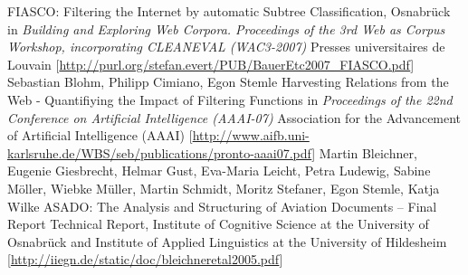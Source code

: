 \documentclass[11pt,a4paper]{moderncv}
\begin{document}
        {FIASCO: Filtering the Internet by automatic Subtree Classification,
        Osnabr{\"u}ck}
        {\small in {\em Building and Exploring Web Corpora. Proceedings of the
        3rd Web as Corpus Workshop, incorporating CLEANEVAL (WAC3-2007)}}
        {\small Presses universitaires de Louvain}
        {[\url{http://purl.org/stefan.evert/PUB/BauerEtc2007_FIASCO.pdf}]}
        {Sebastian Blohm, Philipp Cimiano, Egon Stemle}
        {Harvesting Relations from the Web - Quantifiying the Impact of
        Filtering Functions}
        {\small in {\em Proceedings of the 22nd Conference on Artificial
        Intelligence (AAAI-07)}}
        {\small Association for the Advancement of Artificial Intelligence
        (AAAI)}
        {[\url{http://www.aifb.uni-karlsruhe.de/WBS/seb/publications/pronto-aaai07.pdf}]}
        {Martin Bleichner, Eugenie Giesbrecht, Helmar Gust, Eva-Maria Leicht,
        Petra Ludewig, Sabine M{\"o}ller, Wiebke M{\"u}ller, Martin Schmidt,
        Moritz Stefaner, Egon Stemle, Katja Wilke}
        {ASADO: The Analysis and Structuring of Aviation Documents -- Final Report}
        {\small Technical Report, Institute of Cognitive Science at the
        University of Osnabr{\"u}ck and Institute of Applied Linguistics at the
        University of Hildesheim}
        {}
        {[\url{http://iiegn.de/static/doc/bleichneretal2005.pdf}]}
\closesection{}


\end{document}
